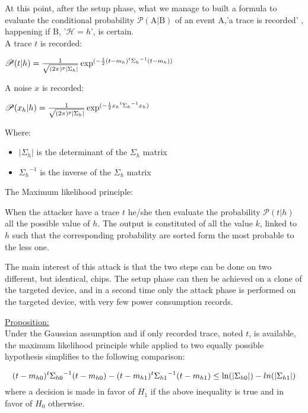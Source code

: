 At this point, after the setup phase, what we manage to built a formula to evaluate the conditional probability 
$ \mathscr{P}( \mathrm{A} | \mathrm{B} )$ of an event $\mathrm{A}$,'a trace is recorded' , happening if $\mathrm{B}$,
'$\mathcal{H}=h$', is certain. \\
A trace $t$ is recorded:
\begin{center}
$\mbox{\Huge}{ \mathscr{P}(t | h) = \frac{ 1 }{ \sqrt{ (2\pi)^p |{\Sigma_h}| } } 
				\exp^{( -\frac{1}{2} (t-m_h)^t {{\Sigma_h}}^{-1} (t-m_h) )}	
				}  $			
\end{center}
A noise $x$ is recorded:
\begin{center}
$\mbox{\Huge}{	\mathscr{P}(x_h | h)   =\frac{ 1 }{ \sqrt{ (2\pi)^p |{\Sigma_h}| } } 
				\exp^{( -\frac{1}{2} {x_h}^t {{\Sigma_h}}^{-1} x_h )}			
				}  $			
\end{center}
Where:
\begin{itemize}
	\item $ |{\Sigma_h}| $ is the determinant of the $ {\Sigma_h} $ matrix
	\item $ {{\Sigma_h}}^{-1} $ is the inverse of the $ {\Sigma_h} $ matrix
\end{itemize}


The Maximum likelihood principle:

When the attacker have a trace $t$ he/she then evaluate the probability
$\mathscr{P}(t | h)$ all the possible value of $h$. The output is constituted 
of all the value $k$, linked to $h$ such that the corresponding probability 
are sorted form the most probable to the less one.


The main interest of this attack is that the two steps can be done on two different,
but identical, chips. The setup phase can then be achieved on a clone of the targeted 
device, and in a second time only the attack phase is performed on the targeted device,
with very few power consumption records.

\underline{Proposition:}\\
Under the Gaussian assumption and if only recorded trace, noted $t$, is available, the maximum likelihood principle
while applied to two equally possible hypothesis simplifies to the following comparison:

$$\mbox{\Huge}{
				(t-m_{h0})^t {{\Sigma_{h0}}}^{-1} (t-m_{h0}) 
			   -(t-m_{h1})^t {{\Sigma_{h1}}}^{-1} (t-m_{h1})  \leq
			   \ln (|\Sigma_{h0}|)-ln(|\Sigma_{h1}|)	
				}  $$	
				where a decision is made in favor of $H_1$ if the above inequality is true and in favor of $H_0$ otherwise.
\newpage
